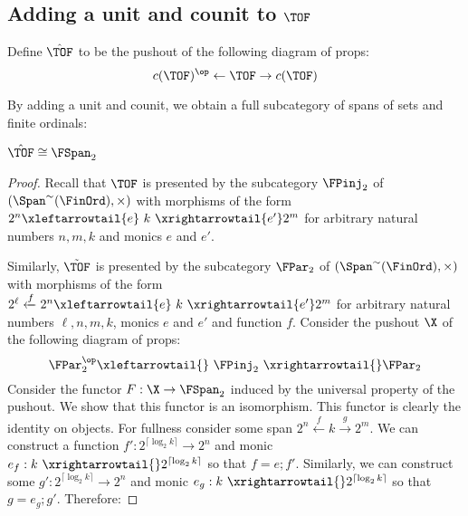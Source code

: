 \subsection{Adding a unit and counit to  \texorpdfstring{$\TOF$}{TOF}}
\begin{definition}
Define $\hat\TOF$ to be the pushout of the following diagram of props:
$$c(\TOF)^\op \leftarrow \TOF \rightarrow c(\TOF)$$
\end{definition}
By adding a unit and counit, we obtain a full subcategory of spans of sets and finite ordinals:
\begin{proposition}
\label{lemma:unitcounit}
$\hat \TOF \cong \FSpan_2$
\end{proposition}
\begin{proof}
Recall that $\TOF$ is presented by the subcategory $\FPinj_2$ of $(\Span^\sim (\FinOrd),\times)$ with morphisms of the form $ 2^n \xleftarrowtail{e}\ k\ \xrightarrowtail{e'} 2^m$ for arbitrary natural numbers $n,m,k$ and monics $e$ and $e'$.



Similarly, $\tilde \TOF$ is presented by the subcategory $\FPar_2$ of  $(\Span^\sim (\FinOrd),\times)$ with morphisms of the form $2^\ell \xleftarrow{f}  2^n  \xleftarrowtail{e}\ k \ \xrightarrowtail{e'}  2^m$ for arbitrary natural numbers $\ell, n,m,k$, monics $e$ and $e'$ and function $f$.
Consider the pushout $\X$ of the following diagram of props:
$$\FPar_2^\op \xleftarrowtail{}  \ \FPinj_2 \ \xrightarrowtail{} \FPar_2$$ 
Consider the functor $F:\X\to\FSpan_2$ induced by the universal property of the pushout.  We show that this functor is an isomorphism.
This functor is clearly the identity on objects.
For fullness consider some span $2^n \xleftarrow{f} k \xrightarrow{g} 2^m$. We can construct a function $f':2^{\lceil \log_2 k \rceil} \rightarrow 2^n$ and monic $e_f: k \ \xrightarrowtail{} 2^{\lceil \log_2 k \rceil}$ so that $f=e;f'$.  Similarly, we can construct some  $g':2^{\lceil \log_2 k \rceil} \rightarrow 2^n$ and monic $e_g: k\ \xrightarrowtail{} 2^{\lceil \log_2 k \rceil}$ so that $g=e_g;g'$.  Therefore:


\end{proof}
